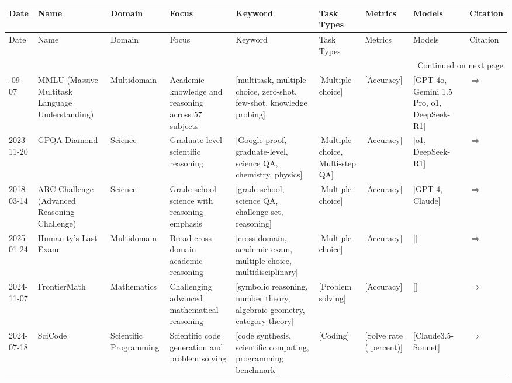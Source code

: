 \documentclass{article}
\begin{document}
\begin{landscape}
{\footnotesize
\begin{longtable}{|p{1.5cm}|p{2.5cm}|p{2cm}|p{2cm}|p{2.5cm}|p{3cm}|p{2cm}|p{2cm}|p{1cm}|}
\hline
Date & Name & Domain & Focus & Keyword & Task Types & Metrics & Models & Citation \\ \hline
\endfirsthead
\hline
Date & Name & Domain & Focus & Keyword & Task Types & Metrics & Models & Citation \\ \hline
\endhead
\hline
\multicolumn{9}{r}{Continued on next page} \\
\endfoot
\hline
\endlastfoot
2020-09-07 & MMLU (Massive Multitask Language Understanding) & Multidomain & Academic knowledge and reasoning across 57 subjects & [multitask, multiple-choice, zero-shot, few-shot, knowledge probing] & [Multiple choice] & [Accuracy] & [GPT-4o, Gemini 1.5 Pro, o1, DeepSeek-R1] & \cite{hendrycks2021measuring} \href{https://arxiv.org/abs/2009.03300}{$\Rightarrow$ } \\ \hline
2023-11-20 & GPQA Diamond & Science & Graduate-level scientific reasoning & [Google-proof, graduate-level, science QA, chemistry, physics] & [Multiple choice, Multi-step QA] & [Accuracy] & [o1, DeepSeek-R1] & \cite{rein2023gpqagraduatelevelgoogleproofqa} \href{https://arxiv.org/abs/2311.12022}{$\Rightarrow$ } \\ \hline
2018-03-14 & ARC-Challenge (Advanced Reasoning Challenge) & Science & Grade-school science with reasoning emphasis & [grade-school, science QA, challenge set, reasoning] & [Multiple choice] & [Accuracy] & [GPT-4, Claude] & \cite{clark2018think} \href{https://allenai.org/data/arc}{$\Rightarrow$ } \\ \hline
2025-01-24 & Humanity's Last Exam & Multidomain & Broad cross-domain academic reasoning & [cross-domain, academic exam, multiple-choice, multidisciplinary] & [Multiple choice] & [Accuracy] & [] & \cite{phan2025humanitys} \href{https://arxiv.org/abs/2501.14249}{$\Rightarrow$ } \\ \hline
2024-11-07 & FrontierMath & Mathematics & Challenging advanced mathematical reasoning & [symbolic reasoning, number theory, algebraic geometry, category theory] & [Problem solving] & [Accuracy] & [] & \cite{glazer2024frontiermath} \href{https://arxiv.org/abs/2411.04872}{$\Rightarrow$ } \\ \hline
2024-07-18 & SciCode & Scientific Programming & Scientific code generation and problem solving & [code synthesis, scientific computing, programming benchmark] & [Coding] & [Solve rate ( percent)] & [Claude3.5-Sonnet] & \cite{tian2024scicode} \href{https://arxiv.org/abs/2407.13168}{$\Rightarrow$ } \\ \hline

\end{longtable}}
\end{landscape}
\end{document}
